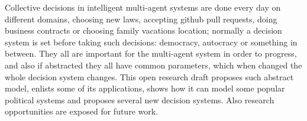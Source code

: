 Collective decisions in intelligent multi-agent systems are done every day on different domains, choosing new laws, accepting github pull requests, doing business contracts or choosing family vacations location; normally a decision system is set before taking such decisions: democracy, autocracy or something in between. They all are important for the multi-agent system in order to progress, and also if abstracted they all have common parameters, which when changed the whole decision system changes. This open research draft proposes such abstract model, enlists some of its applications, shows how it can model some popular political systems and proposes several new decision systems. Also research opportunities are exposed for future work.